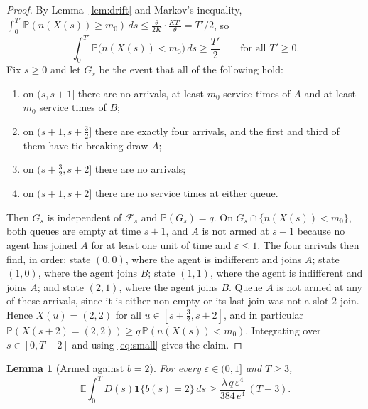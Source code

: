 \documentclass[11pt]{article}
\newtheorem{blem}[bthm]{Lemma}
\theoremstyle{definition}
\theoremstyle{remark}
\newcommand{\E}{\mathbb{E}}
\renewcommand{\Pr}{\mathbb{P}}
\newcommand{\ind}{\mathbf{1}}
\newcommand{\cF}{\mathcal{F}}
\begin{document}
\begin{proof}
By Lemma~\ref{lem:drift} and Markov's inequality,
$\int_0^{T'}\Pr(n(X(s))\ge m_0)\,ds\le\frac{\theta}{2K}\cdot\frac{KT'}{\theta}
=T'/2$, so
\begin{equation}\label{eq:small}
  \int_0^{T'}\Pr\bigl(n(X(s))<m_0\bigr)\,ds\ge\frac{T'}{2}
  \qquad\text{for all }T'\ge0 .
\end{equation}
Fix $s\ge0$ and let $G_s$ be the event that all of the following hold:
\begin{enumerate}
\item on $(s,s+1]$ there are no arrivals, at least $m_0$ service times of $A$
  and at least $m_0$ service times of $B$;
\item on $(s+1,s+\tfrac32]$ there are exactly four arrivals, and the first and
  third of them have tie-breaking draw $A$;
\item on $(s+\tfrac32,s+2]$ there are no arrivals;
\item on $(s+1,s+2]$ there are no service times at either queue.
\end{enumerate}
Then $G_s$ is independent of $\cF_s$ and $\Pr(G_s)=q$. On
$G_s\cap\{n(X(s))<m_0\}$, both queues are empty at time $s+1$, and $A$ is not
armed at $s+1$ because no agent has joined $A$ for at least one unit of time
and $\varepsilon\le1$. The four arrivals then find, in order: state $(0,0)$,
where the agent is indifferent and joins $A$; state $(1,0)$, where the agent
joins $B$; state $(1,1)$, where the agent is indifferent and joins $A$; and
state $(2,1)$, where the agent joins $B$. Queue $A$ is not armed at any of
these arrivals, since it is either non-empty or its last join was not a
slot-$2$ join. Hence $X(u)=(2,2)$ for all $u\in[s+\tfrac32,s+2]$, and in
particular $\Pr(X(s+2)=(2,2))\ge q\,\Pr(n(X(s))<m_0)$. Integrating over
$s\in[0,T-2]$ and using \eqref{eq:small} gives the claim.
\end{proof}

\begin{blem}[Armed against $b=2$]\label{lem:good}
For every $\varepsilon\in(0,1]$ and $T\ge3$,
\[
  \E\int_0^T D(s)\ind\{b(s)=2\}\,ds\ge
  \frac{\lambda\,q\,\varepsilon^{4}}{384\,e^{4}}\,(T-3).
\]
\end{blem}
\end{document}
